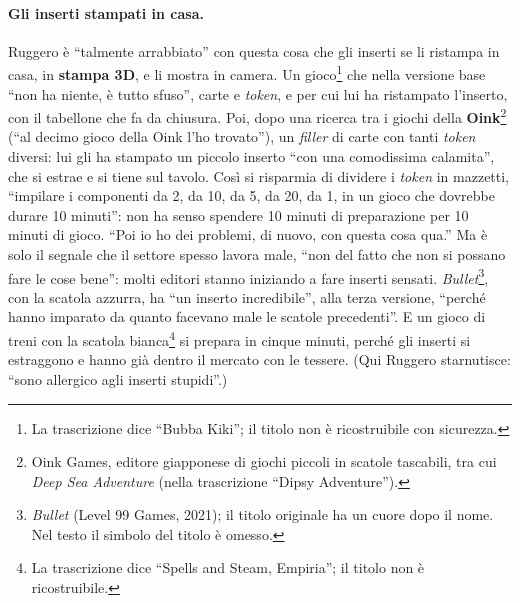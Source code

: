 \paragraph{Gli inserti stampati in casa.} Ruggero è ``talmente arrabbiato'' con questa
cosa che gli inserti se li ristampa in casa, in \textbf{stampa 3D}, e li mostra in camera.
Un gioco\footnote{La trascrizione dice ``Bubba Kiki''; il titolo non è ricostruibile con
sicurezza.} che nella versione base ``non ha niente, è tutto sfuso'', carte e
\emph{token}, e per cui lui ha ristampato l'inserto, con il tabellone che fa da
chiusura. Poi, dopo una ricerca tra i giochi della \textbf{Oink}\footnote{Oink Games,
editore giapponese di giochi piccoli in scatole tascabili, tra cui \emph{Deep Sea
Adventure} (nella trascrizione ``Dipsy Adventure'').} (``al decimo gioco della Oink l'ho
trovato''), un \emph{filler} di carte con tanti \emph{token} diversi: lui gli ha stampato
un piccolo inserto ``con una comodissima calamita'', che si estrae e si tiene sul tavolo.
Così si risparmia di dividere i \emph{token} in mazzetti, ``impilare i componenti da 2,
da 10, da 5, da 20, da 1, in un gioco che dovrebbe durare 10 minuti'': non ha senso
spendere 10 minuti di preparazione per 10 minuti di gioco. ``Poi io ho dei problemi, di
nuovo, con questa cosa qua.'' Ma è solo il segnale che il settore spesso lavora male,
``non del fatto che non si possano fare le cose bene'': molti editori stanno iniziando a
fare inserti sensati. \emph{Bullet}\footnote{\emph{Bullet} (Level 99 Games, 2021); il titolo originale ha un cuore dopo il nome. Nel
testo il simbolo del titolo è omesso.}, con la scatola azzurra, ha ``un inserto
incredibile'', alla terza versione, ``perché hanno imparato da quanto facevano male le
scatole precedenti''. E un gioco di treni con la scatola bianca\footnote{La
trascrizione dice ``Spells and Steam, Empiria''; il titolo non è ricostruibile.} si
prepara in cinque minuti, perché gli inserti si estraggono e hanno già dentro il mercato
con le tessere. (Qui Ruggero starnutisce: ``sono allergico agli inserti stupidi''.)

